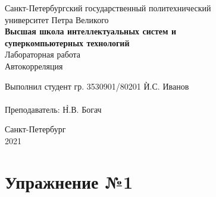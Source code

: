 \documentclass[a4paper, 14pt]{extarticle}
\begin{document}
    \begin{center}
        \begin{center}
            \hfill \break
            \normalsize{Санкт-Петербургский государственный политехнический}\\
            \normalsize{университет Петра Великого}\\
            \hfill \break
            \normalsize{\textbf{Высшая школа интеллектуальных систем и}}\\
            \normalsize{\textbf{суперкомпьютерных технологий}}\\
            \hfill \break
            \hfill \break
            \hfill \break
            \normalsize{Лабораторная работа}\\
            \hfill \break
            \normalsize{\LARGE Автокорреляция}\\
        \end{center}
        \hfill \break
        \hfill \break
        \hfill \break
        \hfill \break
        \hfill \break
        \hfill \break
        \hfill \break
        \hfill \break
        \hfill \break
        \hfill \break
        \begin{tabbing}
            Выполнил студент гр. 3530901/80201 \`И.С. Иванов\\
            \\
            Преподаватель: \`Н.В. Богач\\
        \end{tabbing}
        \hfill \break
        \hfill \break
        \hfill \break
        \hfill \break
        \begin{center}
            Санкт-Петербург\\
            2021
        \end{center}
        \thispagestyle{empty}
    \end{center}

    \newpage
    \tableofcontents

    \newpage
    \listoffigures

    \newpage
    \lstlistoflistings

    \newpage


    \section{Упражнение №1}
    \label{sec:1}
\end{document}
